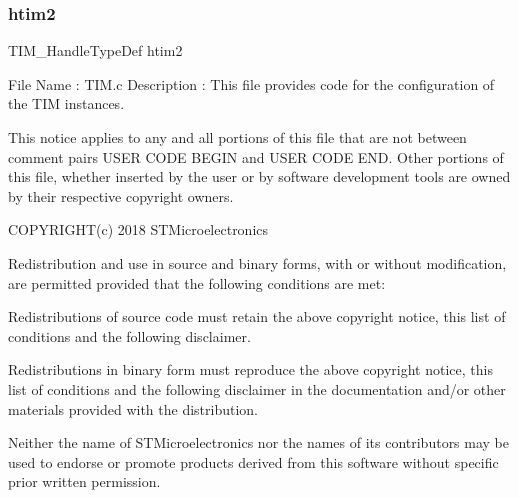 \subsubsection{htim2}
{\footnotesize\ttfamily T\+I\+M\+\_\+\+Handle\+Type\+Def htim2}

File Name \+: T\+I\+M.\+c Description \+: This file provides code for the configuration of the T\+IM instances.

This notice applies to any and all portions of this file that are not between comment pairs U\+S\+ER C\+O\+DE B\+E\+G\+IN and U\+S\+ER C\+O\+DE E\+ND. Other portions of this file, whether inserted by the user or by software development tools are owned by their respective copyright owners.

C\+O\+P\+Y\+R\+I\+G\+H\+T(c) 2018 S\+T\+Microelectronics

Redistribution and use in source and binary forms, with or without modification, are permitted provided that the following conditions are met\+:
\begin{DoxyEnumerate}
\item Redistributions of source code must retain the above copyright notice, this list of conditions and the following disclaimer.
\item Redistributions in binary form must reproduce the above copyright notice, this list of conditions and the following disclaimer in the documentation and/or other materials provided with the distribution.
\item Neither the name of S\+T\+Microelectronics nor the names of its contributors may be used to endorse or promote products derived from this software without specific prior written permission.
\end{DoxyEnumerate}

